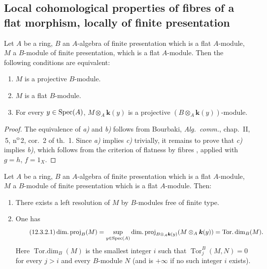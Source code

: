 \subsection{Local cohomological properties of fibres of a flat morphism, locally of finite presentation}
\label{subsection:IV.12.3}

\begin{lemma}[12.3.1]
\label{IV.12.3.1}
Let $A$ be a ring, $B$ an $A$-algebra of finite presentation which is a flat $A$-module, $M$ a $B$-module of finite presentation, which is a flat $A$-module.
Then the following conditions are equivalent:
\begin{enumerate}[label=\emph{\alph*)}]
  \item $M$ is a projective $B$-module.
  \item $M$ is a flat $B$-module.
  \item For every $y\in\operatorname{Spec}(A)$, $M\otimes_A\boldsymbol{k}(y)$ is a projective $(B\otimes_A\boldsymbol{k}(y))$-module.
\end{enumerate}
\end{lemma}

\begin{proof}

The equivalence of \emph{a)} and \emph{b)} follows from Bourbaki, \emph{Alg.\ comm.}, chap.~II, \textsection\,5, n\textsuperscript{o}\,2, cor.~2 of th.~1.
Since \emph{a)} implies \emph{c)} trivially, it remains to prove that \emph{c)} implies \emph{b)}, which follows from the criterion of flatness by fibres , applied with $g=h$, $f=1_X$.
\end{proof}

\begin{proposition}[12.3.2]
\label{IV.12.3.2}
Let $A$ be a ring, $B$ an $A$-algebra of finite presentation which is a flat $A$-module, $M$ a $B$-module of finite presentation which is a flat $A$-module.
Then:
\begin{enumerate}[label=\textup{(\roman*)}]
  \item There exists a left resolution of $M$ by $B$-modules free of finite type.
  \item One has
  \begin{equation}
  \tag{12.3.2.1}
  \label{IV.12.3.2.1}
    \operatorname{dim.proj}_B(M)
    = \sup_{y\in\operatorname{Spec}(A)} \operatorname{dim.proj}_{B\otimes_A\boldsymbol{k}(y)}(M\otimes_A\boldsymbol{k}(y))
    = \operatorname{Tor.dim}_B(M).
  \end{equation}
  Here $\operatorname{Tor.dim}_B(M)$ is the smallest integer $i$ such that $\operatorname{Tor}_j^B(M,N)=0$ for every $j>i$ and every $B$-module $N$ (and is $+\infty$ if no such integer $i$ exists).
\end{enumerate}
\end{proposition}

